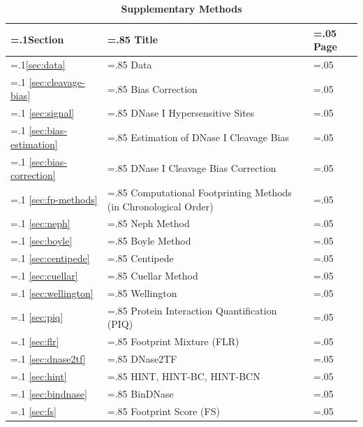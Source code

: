 \documentclass[11pt]{article}
\begin{document}
\begin{table}[h!]
\small
\begin{flushleft}
\caption*{\textbf{{\small Supplementary Methods}}}
\vspace{-0.4cm}
\end{flushleft}
\begin{center}
\renewcommand{\arraystretch}{1.2}
\begin{tabularx}{\textwidth}{ |>{\hsize=.1\hsize}X|>{\hsize=.85\hsize}X|>{\hsize=.05\hsize}X| }
\hline
\textbf{Section} & \textbf{Title} & \textbf{Page} \\
\hline
\ref{sec:data} & Data  & \pageref{sec:data} \\
\hline
\ref{sec:cleavage-bias} & Bias Correction  & \pageref{sec:cleavage-bias} \\
\hline
\ref{sec:signal} & DNase I Hypersensitive Sites  & \pageref{sec:signal} \\
\hline
\ref{sec:bias-estimation} & Estimation of DNase I Cleavage Bias  & \pageref{sec:bias-estimation} \\
\hline
\ref{sec:bias-correction} & DNase I Cleavage Bias Correction  & \pageref{sec:bias-correction} \\
\hline
\ref{sec:fp-methods} & Computational Footprinting Methods (in Chronological Order)  & \pageref{sec:fp-methods} \\
\hline
\ref{sec:neph} & Neph Method  & \pageref{sec:neph} \\
\hline
\ref{sec:boyle} & Boyle Method  & \pageref{sec:boyle} \\
\hline
\ref{sec:centipede} & Centipede  & \pageref{sec:centipede} \\
\hline
\ref{sec:cuellar} & Cuellar Method  & \pageref{sec:cuellar} \\
\hline
\ref{sec:wellington} & Wellington  & \pageref{sec:wellington} \\
\hline
\ref{sec:piq} & Protein Interaction Quantification (PIQ)  & \pageref{sec:piq} \\
\hline
\ref{sec:flr} & Footprint Mixture (FLR)  & \pageref{sec:flr} \\
\hline
\ref{sec:dnase2tf} & DNase2TF  & \pageref{sec:dnase2tf} \\
\hline
\ref{sec:hint} & HINT, HINT-BC, HINT-BCN  & \pageref{sec:hint} \\
\hline
\ref{sec:bindnase} & BinDNase & \pageref{sec:bindnase} \\
\hline
\ref{sec:fs} & Footprint Score (FS)  & \pageref{sec:fs} \\

\end{tabularx}
\end{center}
\end{table}
\end{document}
